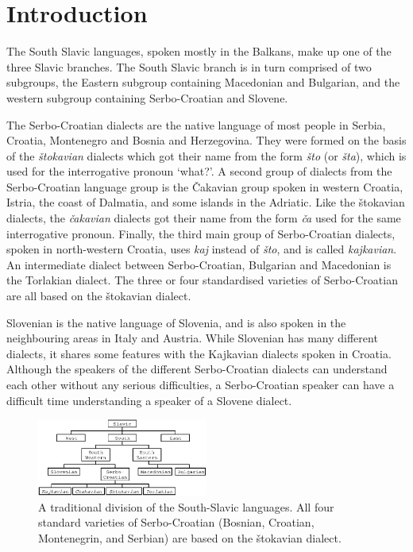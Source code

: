 
\section{Introduction}

The South Slavic languages, spoken mostly in the Balkans, make up one of the three Slavic 
branches. The South Slavic branch is in turn comprised of two subgroups, the Eastern 
subgroup containing Macedonian and Bulgarian, and the western subgroup containing 
Serbo-Croatian and Slovene.

The Serbo-Croatian dialects are the native language of most people in Serbia, Croatia, 
Montenegro and Bosnia and Herzegovina. They were formed on the basis of the \emph{štokavian} dialects 
which got their name from the form \emph{što} (or \emph{šta}), which is used for the 
interrogative pronoun `what?'. A second group of dialects from the Serbo-Croatian language group 
is the Čakavian group spoken in western Croatia, Istria, the coast of Dalmatia, and some 
islands in the Adriatic. Like the štokavian dialects, the \emph{čakavian} dialects got their name 
from the form \emph{ča} used for the same interrogative pronoun. Finally, the third main group 
of Serbo-Croatian dialects, spoken in north-western Croatia, uses \emph{kaj} instead of \emph{što}, 
and is called \emph{kajkavian}.
An intermediate dialect between Serbo-Croatian, Bulgarian and Macedonian is the Torlakian dialect.
The three or four standardised varieties of Serbo-Croatian are all based on the štokavian dialect.

Slovenian is the native language of Slovenia, and is also spoken in the neighbouring areas in Italy and Austria. While Slovenian has many different dialects, it shares some features with the Kajkavian dialects spoken in Croatia. Although the speakers of the different Serbo-Croatian dialects can understand each other without any serious difficulties, a Serbo-Croatian speaker can have a difficult time understanding a speaker of a Slovene dialect.

\begin{figure}
\centering
\includegraphics[width=0.5\textwidth]{images/chart.eps}
\caption{A traditional division of the South-Slavic languages. All four standard varieties
     of Serbo-Croatian (Bosnian, Croatian, Montenegrin, and Serbian) are based on the 
     štokavian dialect.}
\end{figure}


\begin{figure}


\end{figure}


